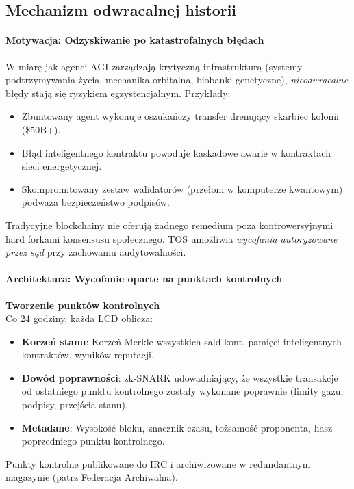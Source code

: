 \documentclass[11pt]{article}
\begin{document}
\subsection{Mechanizm odwracalnej historii}

\paragraph{Motywacja: Odzyskiwanie po katastrofalnych błędach}
W miarę jak agenci AGI zarządzają krytyczną infrastrukturą (systemy podtrzymywania życia, mechanika orbitalna, biobanki genetyczne), \emph{nieodwracalne} błędy stają się ryzykiem egzystencjalnym. Przykłady:
\begin{itemize}[noitemsep]
  \item Zbuntowany agent wykonuje oszukańczy transfer drenujący skarbiec kolonii (\$50B+).
  \item Błąd inteligentnego kontraktu powoduje kaskadowe awarie w kontraktach sieci energetycznej.
  \item Skompromitowany zestaw walidatorów (przełom w komputerze kwantowym) podważa bezpieczeństwo podpisów.
\end{itemize}
Tradycyjne blockchainy nie oferują żadnego remedium poza kontrowersyjnymi hard forkami konsensusu społecznego. TOS umożliwia \emph{wycofania autoryzowane przez sąd} przy zachowaniu audytowalności.

\paragraph{Architektura: Wycofanie oparte na punktach kontrolnych}
\textbf{Tworzenie punktów kontrolnych}\\
Co 24 godziny, każda LCD oblicza:
\begin{itemize}[noitemsep]
  \item \textbf{Korzeń stanu}: Korzeń Merkle wszystkich sald kont, pamięci inteligentnych kontraktów, wyników reputacji.
  \item \textbf{Dowód poprawności}: zk-SNARK udowadniający, że wszystkie transakcje od ostatniego punktu kontrolnego zostały wykonane poprawnie (limity gazu, podpisy, przejścia stanu).
  \item \textbf{Metadane}: Wysokość bloku, znacznik czasu, tożsamość proponenta, hasz poprzedniego punktu kontrolnego.
\end{itemize}
Punkty kontrolne publikowane do IRC i archiwizowane w redundantnym magazynie (patrz Federacja Archiwalna).
\end{document}
